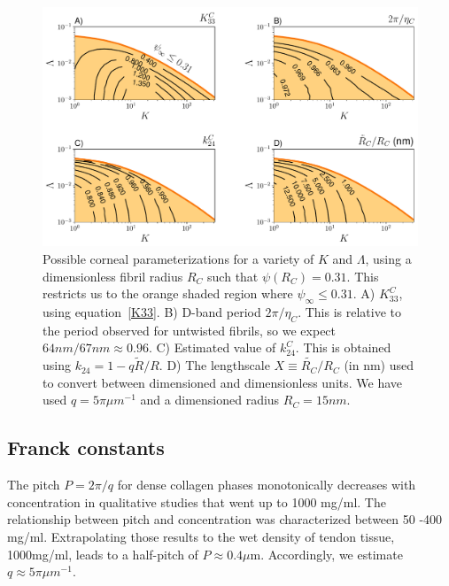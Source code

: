 \documentclass[twoside,twocolumn,9pt]{article}
\begin{document}
\begin{figure}[tb!] %
   \centering
   \includegraphics[width=17.1cm]{figure6.pdf} 
   \caption{Possible corneal parameterizations for a variety of $K$ and $\Lambda$, using a dimensionless fibril radius $R_C$ such that $\psi(R_C) = 0.31$. This restricts us to the orange shaded region where $\psi_\infty \leq 0.31$. A) $K_{33}^C$, using equation~\ref{K33}. B) D-band period $2 \pi/\eta_C$. This is relative to the period observed for untwisted fibrils, so we expect $64nm/67nm \approx 0.96$.\cite{Raspanti:2018} C) Estimated value of $k_{24}^C$. This is obtained using $k_{24} = 1-q \tilde{R}/R$.  D) The lengthscale $X \equiv \tilde{R_C}/R_C$ (in nm) used to convert between dimensioned and dimensionless units.  We have used $q = 5 \pi \mu m^{-1}$ and a dimensioned radius $R_C = 15nm$.}
   \label{fig:cornea}
\end{figure}

\subsection{Franck constants}
The pitch $P=2\pi/q$ for dense collagen phases monotonically decreases with concentration in qualitative studies that went up to 1000 mg/ml.\cite{Mosser:2006} The relationship between pitch and concentration was characterized between 50 -400 mg/ml.\cite{DeSaPeixoto:2011} Extrapolating those results to the wet density of tendon tissue, 1000mg/ml,\cite{Ker:1981} leads to a half-pitch of $P\approx 0.4\mu$m. Accordingly, we estimate $q \approx 5 \pi \mu m^{-1}$.
\end{document}
